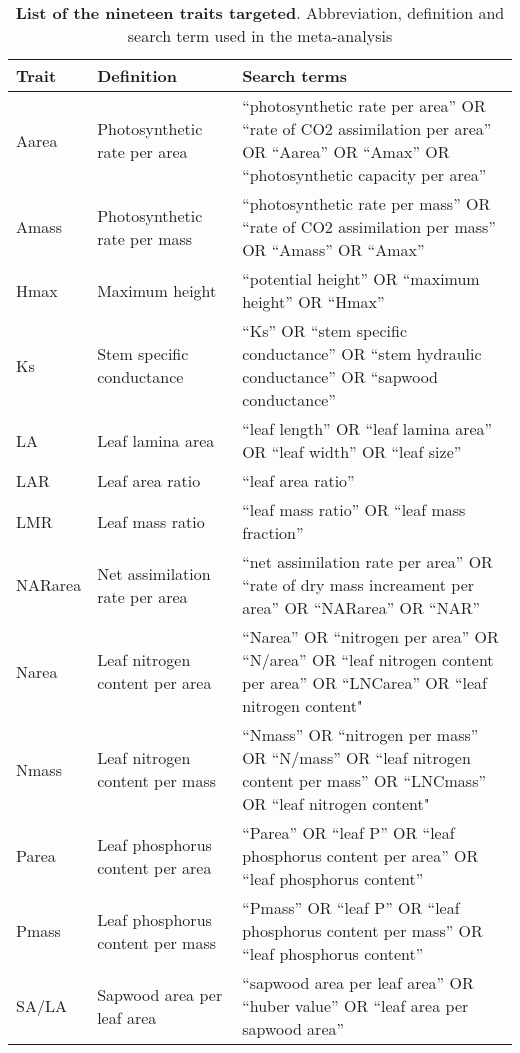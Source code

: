 \documentclass[a4paper,11pt]{article}
\begin{document}
\begin{appendices}
\begin{table}[h!]
\centering
\caption{\textbf{List of the nineteen traits targeted}. Abbreviation,
definition and search term used in the meta-analysis}
\label{tab:lit_search}
\vspace{0.5cm}
{\footnotesize
\begin{tabular}{p{3cm}p{3cm}p{8cm}}
  \hline
Trait & Definition & Search terms \\
  \hline
Aarea & Photosynthetic rate per area & ``photosynthetic rate per area'' OR ``rate of CO2 assimilation per area'' OR ``Aarea'' OR ``Amax'' OR ``photosynthetic capacity per area'' \\
  Amass & Photosynthetic rate per mass & ``photosynthetic rate per mass'' OR ``rate of CO2 assimilation per mass'' OR ``Amass'' OR ``Amax'' \\
  Hmax & Maximum height & ``potential height'' OR ``maximum height'' OR ``Hmax'' \\
  Ks & Stem specific conductance & ``Ks'' OR ``stem specific conductance'' OR ``stem hydraulic conductance'' OR ``sapwood conductance'' \\
  LA & Leaf lamina area & ``leaf length'' OR ``leaf lamina area'' OR ``leaf width'' OR ``leaf size'' \\
  LAR & Leaf area ratio & ``leaf area ratio'' \\
  LMR & Leaf mass ratio & ``leaf mass ratio'' OR ``leaf mass fraction'' \\
  NARarea & Net assimilation rate per area &  ``net assimilation rate per area'' OR ``rate of dry mass increament per area'' OR ``NARarea'' OR ``NAR'' \\
  Narea & Leaf nitrogen content per area & ``Narea'' OR ``nitrogen per area'' OR ``N/area'' OR ``leaf nitrogen content per area'' OR ``LNCarea'' OR ``leaf nitrogen content" \\
  Nmass & Leaf nitrogen content per mass & ``Nmass'' OR ``nitrogen per mass'' OR ``N/mass'' OR ``leaf nitrogen content per mass'' OR ``LNCmass'' OR ``leaf nitrogen content" \\
  Parea & Leaf phosphorus content per area & ``Parea'' OR ``leaf P'' OR  ``leaf phosphorus content per area''  OR ``leaf phosphorus content'' \\
  Pmass & Leaf phosphorus content per mass & ``Pmass'' OR ``leaf P'' OR  ``leaf phosphorus content per mass'' OR ``leaf phosphorus content'' \\
  SA/LA & Sapwood area per leaf area & ``sapwood area per leaf area'' OR ``huber value'' OR ``leaf area per sapwood area'' \\

\end{tabular}}
\end{table}
\end{appendices}
\end{document}
